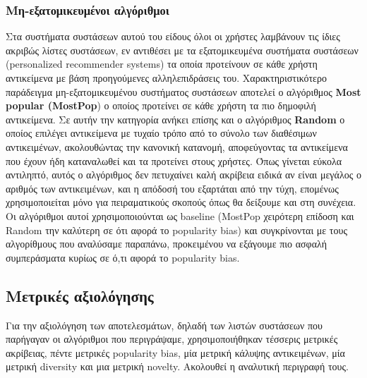 \subsubsection{Μη-εξατομικευμένοι αλγόριθμοι}
\noindent Στα συστήματα συστάσεων αυτού του είδους όλοι οι χρήστες λαμβάνουν τις ίδιες ακριβώς λίστες συστάσεων, εν αντιθέσει με τα εξατομικευμένα συστήματα συστάσεων (personalized recommender systems) τα οποία προτείνουν σε κάθε χρήστη αντικείμενα με βάση προηγούμενες αλληλεπιδράσεις του. Χαρακτηριστικότερο παράδειγμα μη-εξατομικευμένου συστήματος συστάσεων αποτελεί ο αλγόριθμος \textbf{Most popular (MostPop}) ο οποίος προτείνει σε κάθε χρήστη τα πιο δημοφιλή αντικείμενα. Σε αυτήν την κατηγορία ανήκει επίσης και ο αλγόριθμος \textbf{Random} ο οποίος επιλέγει αντικείμενα με τυχαίο τρόπο από το σύνολο των διαθέσιμων αντικειμένων, ακολουθώντας την κανονική κατανομή, αποφεύγοντας τα αντικείμενα που έχουν ήδη καταναλωθεί και τα προτείνει στους χρήστες. Όπως γίνεται εύκολα αντιληπτό, αυτός ο αλγόριθμος δεν πετυχαίνει καλή ακρίβεια ειδικά αν είναι μεγάλος ο αριθμός των αντικειμένων, και η απόδοσή του εξαρτάται από την τύχη, επομένως χρησιμοποιείται μόνο για πειραματικούς σκοπούς όπως θα δείξουμε και στη συνέχεια.  Οι αλγόριθμοι αυτοί χρησιμοποιούνται ως baseline (MostPop χειρότερη επίδοση και Random την καλύτερη σε ότι αφορά το popularity bias) και συγκρίνονται με τους αλγορίθμους που αναλύσαμε παραπάνω, προκειμένου να εξάγουμε πιο ασφαλή συμπεράσματα κυρίως σε ό,τι αφορά το popularity bias.
\subsection{Μετρικές αξιολόγησης}
\noindent Για την αξιολόγηση των αποτελεσμάτων, δηλαδή των λιστών συστάσεων που παρήγαγαν οι αλγόριθμοι που περιγράψαμε, χρησιμοποιήθηκαν τέσσερις μετρικές ακρίβειας, πέντε μετρικές popularity bias, μία μετρική κάλυψης αντικειμένων, μία μετρική diversity και μια μετρική novelty. Ακολουθεί η αναλυτική περιγραφή τους.
